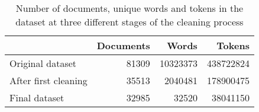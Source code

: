 \begin{table}[tb]
\centering
\caption[Dataset size]{Number of documents, unique words and tokens in the dataset at three different stages of the cleaning process}
\label{tab:dataset}
\begin{tabular}{l|rrr}
\toprule
                     &  Documents &    Words &    Tokens \\
\midrule
    Original dataset &      81309 & 10323373 & 438722824 \\
After first cleaning &      35513 &  2040481 & 178900475 \\
       Final dataset &      32985 &    32520 &  38041150 \\
\bottomrule
\end{tabular}
\end{table}
